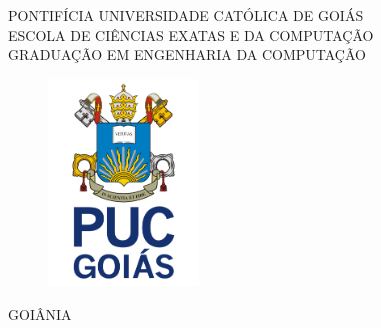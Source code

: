 \begin{center}
    PONTIFÍCIA UNIVERSIDADE CATÓLICA DE GOIÁS \\ \vspace{1mm}
    ESCOLA DE CIÊNCIAS EXATAS E DA COMPUTAÇÃO \\ \vspace{1mm}
    GRADUAÇÃO EM ENGENHARIA DA COMPUTAÇÃO
    \begin{figure}[h]
        \center
        \includegraphics[width=4cm]{estrutura/pre-textuais/logo}
    \end{figure}
    \textbf{\titletcc}
    \authorname
    \begin{bottompar}
        GOIÂNIA \\ \vspace{1mm}
        \the\year
    \end{bottompar}
\end{center}
